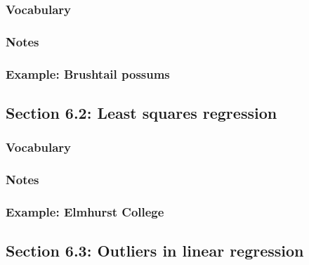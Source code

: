 \documentclass[
]{report}
\begin{document}
\hypertarget{vocabulary-5}{%
\subsubsection*{Vocabulary}\label{vocabulary-5}}

\hypertarget{notes-7}{%
\subsubsection*{Notes}\label{notes-7}}

\hypertarget{example-brushtail-possums}{%
\subsubsection*{Example: Brushtail possums}\label{example-brushtail-possums}}

\hypertarget{section-6.2-least-squares-regression}{%
\subsection*{Section 6.2: Least squares regression}\label{section-6.2-least-squares-regression}}

\hypertarget{vocabulary-6}{%
\subsubsection*{Vocabulary}\label{vocabulary-6}}

\hypertarget{notes-8}{%
\subsubsection*{Notes}\label{notes-8}}

\hypertarget{example-elmhurst-college}{%
\subsubsection*{Example: Elmhurst College}\label{example-elmhurst-college}}

\hypertarget{section-6.3-outliers-in-linear-regression}{%
\subsection*{Section 6.3: Outliers in linear regression}\label{section-6.3-outliers-in-linear-regression}}
\end{document}

